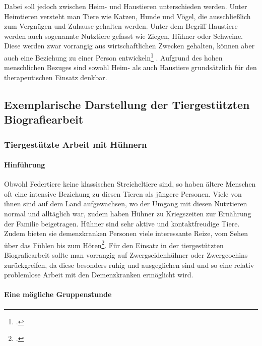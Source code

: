 Dabei soll jedoch zwischen Heim- und Haustieren unterschieden werden. Unter Heimtieren versteht man Tiere wie Katzen, Hunde und Vögel, die ausschließlich zum Vergnügen und Zuhause gehalten werden. Unter dem Begriff Haustiere werden auch sogenannte Nutztiere gefasst wie Ziegen, Hühner oder Schweine. Diese werden zwar vorrangig aus wirtschaftlichen Zwecken gehalten, können aber auch eine Beziehung zu einer Person entwickeln\footcite[vgl.][47f]{Leder2006} . Aufgrund des hohen menschlichen Bezuges sind sowohl Heim- als auch Haustiere grundsätzlich für den therapeutischen Einsatz denkbar.

\subsection{Exemplarische Darstellung der Tiergestützten Biografiearbeit}
\label{sec:k4.3_ExemplarischeDarstellungDerTiergestütztenBiografiearbeit}

\subsubsection{Tiergestützte Arbeit mit Hühnern}
\label{sec:k4.3.1_TiergestützteArbeitMitHühnern}

\paragraph{Hinführung}
\label{sec:k4.3.1.1_Hinfuehrung}

Obwohl Federtiere keine klassischen Streicheltiere sind, so haben ältere Menschen oft eine intensive Beziehung zu diesen Tieren als jüngere Personen. Viele von ihnen sind auf dem Land aufgewachsen, wo der Umgang mit diesen Nutztieren normal und alltäglich war, zudem haben Hühner zu Kriegszeiten zur Ernährung der Familie beigetragen. 
Hühner sind sehr aktive und kontaktfreudige Tiere. Zudem bieten sie demenzkranken Personen viele interessante Reize, vom Sehen über das Fühlen bis zum Hören\footcite[vgl.][33f]{Giruc2011}. Für den Einsatz in der tiergestützten Biografiearbeit sollte man vorrangig auf Zwergseidenhühner oder Zwergcochins zurückgreifen, da diese besonders ruhig und ausgeglichen sind und so eine relativ problemlose Arbeit mit den Demenzkranken ermöglicht wird.

\paragraph{Eine mögliche Gruppenstunde}
\label{sec:k4.3.1.2_EineMöglicheGruppenstunde}

